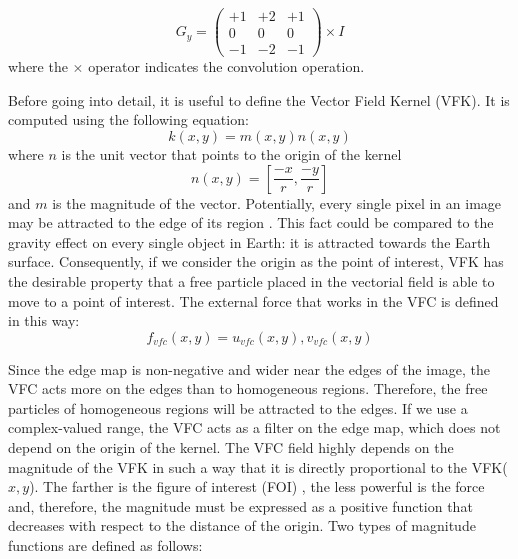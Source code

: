 \documentclass[final,a4paper,12pt,english]{UnicaPhdThesis3}
\begin{document}
{\medskip 

\begin{equation}
G_{y} = \begin{pmatrix}
+1 & +2 & +1 \\
0 & 0 & 0 \\
-1 & -2 & -1 \end{pmatrix} \times I
\end{equation}
where the $\times$ operator indicates the convolution operation.

Before going into detail, it is useful to define the Vector Field Kernel (VFK). It is computed using the following equation:
\begin{equation}
k ( x,y ) =m(x,y)n(x,y)
\end{equation}
where $n$ is the unit vector that points to the origin of the kernel	
\begin{equation}
n ( x,y ) = [\frac{-x}{r} , \frac{-y}{r} ]
\end{equation}
and $m$ is the magnitude of the vector. Potentially, every single pixel in an image may be attracted to the edge of its region \cite{Bing}. This fact could be compared to the gravity effect on every single object in Earth: it is attracted towards the Earth surface. Consequently, if we consider the origin as the point of interest, VFK has the desirable property that a free particle placed in the vectorial field is able to move to a point of interest. The external force that works in the VFC is defined in this way:
\begin{equation}
{f} _{vfc} ( x,y ) = {u} _{vfc} ( x,y ) , {v} _{vfc} (x,y)
\end{equation}

Since the edge map is non-negative and wider near the edges of the image, the VFC acts more on the edges than to homogeneous regions. Therefore, the free particles of homogeneous regions will be attracted to the edges. If we use a complex-valued range, the VFC acts as a filter on the edge map, which does not depend on the origin of the kernel. The VFC field highly depends on the magnitude of the VFK in such a way that it is directly proportional to the VFK($x, y$). 
The farther is the figure of interest (FOI) \cite{Bing}, the less powerful is the force and, therefore, the magnitude must be expressed as a positive function that decreases with respect to the distance of the origin. Two types of magnitude functions are defined as follows:

}
\end{document}
